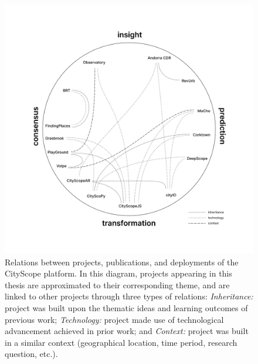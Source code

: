 {{        \begin{figure}[!htb]
            \begin{center}
                \includegraphics[width=1\textwidth]{chapters/introduction/figures/projects_relations.jpg}
            \end{center}
            \caption{
                Relations between projects, publications, and deployments of the CityScope platform. In this diagram, projects appearing in this thesis are approximated to their corresponding theme, and are linked to other projects through three types of relations: \textit{Inheritance:} project was built upon the thematic ideas and learning outcomes of previous work; \textit{Technology:} project made use of technological advancement achieved in prior work; and \textit{Context:} project was built in a similar context (geographical location, time period, research question, etc.).
            }
            \label{fig:projects_relations}
        \end{figure}
    }

    
}





